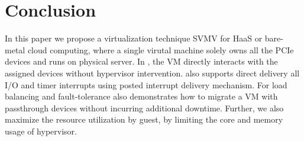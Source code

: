 \section{Conclusion}

In this paper we propose a virtualization technique SVMV
for HaaS or bare-metal cloud computing, where a single 
virutal machine solely owns all the PCIe devices
and runs on physical server. In \sna, the VM directly 
interacts with the assigned devices without hypervisor 
intervention. \sna also supports direct delivery all I/O 
and timer interrupts using posted interrupt
delivery mechanism. For load balancing and 
fault-tolerance \sna also demonstrates how 
to migrate a VM with passthrough devices without incurring 
additional downtime. Further, we also maximize the 
resource utilization by guest, by limiting 
the core and memory usage of hypervisor.

